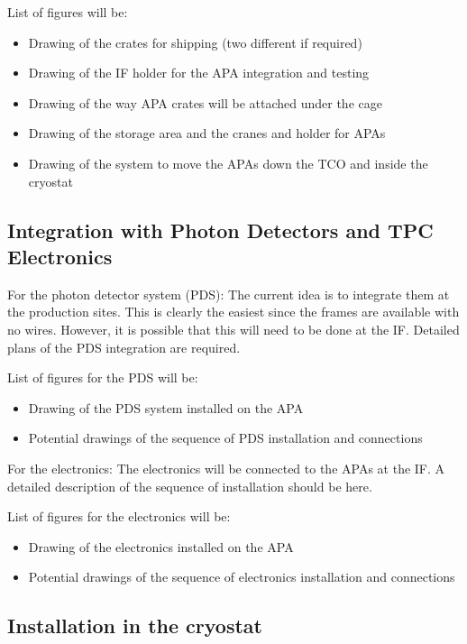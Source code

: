 List of figures will be:
\begin{itemize}

\item{Drawing of the crates for shipping (two different if required)}
\item{Drawing of the IF holder for the APA integration and testing}
\item{Drawing of the way APA crates will be attached under the cage}
\item{Drawing of the storage area and the cranes and holder for APAs}
\item{Drawing of the system to move the APAs down the TCO and inside the cryostat}

\end{itemize}

\subsection{Integration with Photon Detectors and TPC Electronics}
\label{sec:fdsp-apa-install-pds-elec}

For the photon detector system (PDS): The current idea is to integrate them at the production sites. This is clearly the easiest since the frames are available with no wires. However, it is possible that this will need to be done at the IF. Detailed plans of the PDS integration are required.  

List of figures for the PDS will be:
\begin{itemize}
\item{Drawing of the PDS system installed on the APA}
\item{Potential drawings of the sequence of PDS installation and connections}
\end{itemize}

For the electronics: The electronics will be connected to the APAs at the IF. A detailed description of the sequence of installation should be here.

List of figures for the electronics will be:
\begin{itemize}
\item{Drawing of the electronics installed on the APA}
\item{Potential drawings of the sequence of electronics installation and connections}
\end{itemize}


\subsection{Installation in the cryostat}
\label{sec:fdsp-apa-install-cryostat}

